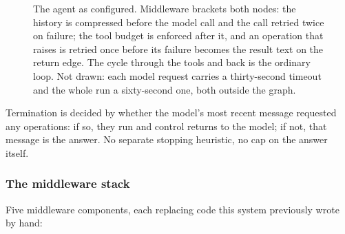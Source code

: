 \documentclass[11pt,a4paper]{article}
\begin{document}
\begin{figure}[H]
\centering
{}
\caption{The agent as configured. Middleware brackets both nodes: the history is
compressed before the model call and the call retried twice on failure; the tool budget
is enforced after it, and an operation that raises is retried once before its failure
becomes the result text on the return edge. The cycle through the tools and back is the
ordinary loop. Not drawn: each model request carries a thirty-second timeout and the
whole run a sixty-second one, both outside the graph.}
\label{fig:machine}
\end{figure}

Termination is decided by whether the model's most recent message requested any
operations: if so, they run and control returns to the model; if not, that message
is the answer. No separate stopping heuristic, no cap on the answer itself.

\subsubsection{The middleware stack}

Five middleware components, each replacing code this system previously wrote by
hand:
\end{document}

